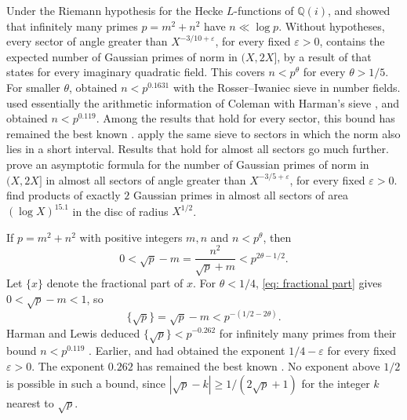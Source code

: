 \documentclass{article}
\numberwithin{equation}{section}
\newcommand{\Ge}{\geqslant}
\begin{document}
Under the Riemann hypothesis for the Hecke $L$-functions of $\mathbb{Q}(i)$, \citet{ankeny1952representations} and \citet{kubilius1955problem} showed that infinitely many primes $p = m^2 + n^2$ have $n \ll \log p$. Without hypotheses, every sector of angle greater than $X^{-3/10 + \varepsilon}$, for every fixed $\varepsilon > 0$, contains the expected number of Gaussian primes of norm in $(X, 2X]$, by a result of \citet{ricci1976local} that \citet[Theorem~3]{coleman1993rosser} states for every imaginary quadratic field. This covers $n < p^{\theta}$ for every $\theta > 1/5$. For smaller $\theta$, \citet{coleman1993rosser} obtained $n < p^{0.1631}$ with the Rosser--Iwaniec sieve in number fields. \citet{harman2001gaussian} used essentially the arithmetic information of Coleman with Harman's sieve \citep{harman2007prime}, and obtained $n < p^{0.119}$. Among the results that hold for every sector, this bound has remained the best known \citep[\S1.2]{jarviniemi2024gaussian}. \citet{harman2004prime} apply the same sieve to sectors in which the norm also lies in a short interval. Results that hold for almost all sectors go much further. \citet{huang2020gaussian} prove an asymptotic formula for the number of Gaussian primes of norm in $(X, 2X]$ in almost all sectors of angle greater than $X^{-3/5 + \varepsilon}$, for every fixed $\varepsilon > 0$. \citet{jarviniemi2024gaussian} find products of exactly $2$ Gaussian primes in almost all sectors of area $(\log X)^{15.1}$ in the disc of radius $X^{1/2}$.

If $p = m^2 + n^2$ with positive integers $m, n$ and $n < p^{\theta}$, then
\begin{equation}
\label{eq: fractional part}
0 < \sqrt{p} - m = \frac{n^2}{\sqrt{p} + m} < p^{2\theta - 1/2}.
\end{equation}
Let $\{x\}$ denote the fractional part of $x$. For $\theta < 1/4$, \eqref{eq: fractional part} gives $0 < \sqrt{p} - m < 1$, so
\begin{equation}
\label{eq: fractional bound}
\{\sqrt{p}\} = \sqrt{p} - m < p^{-(1/2 - 2\theta)}.
\end{equation}
Harman and Lewis deduced $\{\sqrt{p}\} < p^{-0.262}$ for infinitely many primes \citep[Theorem~4]{harman2001gaussian} from their bound $n < p^{0.119}$ \citep[Theorem~1]{harman2001gaussian}. Earlier, \citet{balog1985distribution} and \citet{harman1983distribution} had obtained the exponent $1/4 - \varepsilon$ for every fixed $\varepsilon > 0$. The exponent $0.262$ has remained the best known \citep{li2025remark}. No exponent above $1/2$ is possible in such a bound, since $|\sqrt{p} - k| \Ge 1/(2\sqrt{p} + 1)$ for the integer $k$ nearest to $\sqrt{p}$.
\end{document}
